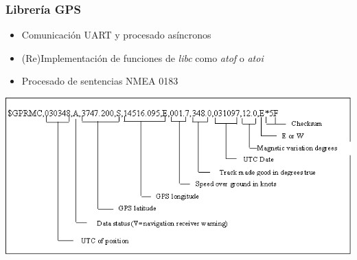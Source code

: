 \documentclass[numfooter]{beamer}
\begin{document}
    \begin{frame}
        \frametitle{Librería GPS}
        \begin{itemize}
            \item Comunicación UART y procesado asíncronos
            \item (Re)Implementación de funciones de \textit{libc} como \textit{atof} o \textit{atoi}
            \item Procesado de sentencias NMEA 0183
        \end{itemize}
        \includegraphics[width=\textwidth]{images/nmea.png}
    \end{frame}
\end{document}
